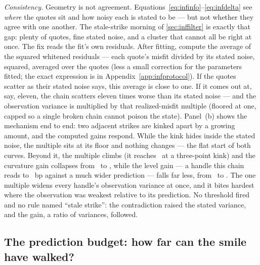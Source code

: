 \emph{Consistency.}  Geometry is not agreement.
Equations~\cref{eq:infinfo}--\cref{eq:infdelta} see \emph{where} the
quotes sit and how noisy each is stated to be --- but not whether
they agree with one another.  The stale-strike morning of
\cref{sec:inffilter} is exactly that gap: plenty of quotes, fine
stated noise, and a cluster that cannot all be right at once.  The
fix reads the fit's own residuals.  After fitting, compute the
average of the squared whitened residuals --- each quote's misfit
divided by its stated noise, squared, averaged over the quotes
(less a small correction for the parameters fitted; the exact
expression is in Appendix~\ref{app:infprotocol}).  If the quotes
scatter as their stated noise says, this average is close to one.
If it comes out at, say, eleven, the chain scatters eleven times
worse than its stated noise --- and the observation variance is
multiplied by that realized-misfit multiple (floored at one, capped
so a single broken chain cannot poison the state).  Panel~(b) shows
the mechanism end to end: two adjacent strikes are kinked apart by a
growing amount, and the computed gains respond.  While the kink
hides inside the stated noise, the multiple sits at its floor and
nothing changes --- the flat start of both curves.  Beyond it, the
multiple climbs (it reaches \MacFiltCovarMultMax\ at a three-point
kink) and the curvature gain collapses from
\MacFiltCovarGainCurvClean\ to \MacFiltCovarGainCurvKinked, while
the level gain --- a handle this chain reads to
\MacFiltCovarBaseSdBp\ bp against a much wider prediction --- falls
far less, from \MacFiltCovarGainLevelClean\ to
\MacFiltCovarGainLevelKinked.  The one multiple widens every
handle's observation variance at once, and it bites hardest where
the observation was weakest relative to its prediction.  No
threshold fired and no rule named ``stale strike'': the
contradiction raised the stated variance, and the gain, a ratio of
variances, followed.

\subsection{The prediction budget: how far can the smile have walked?}

